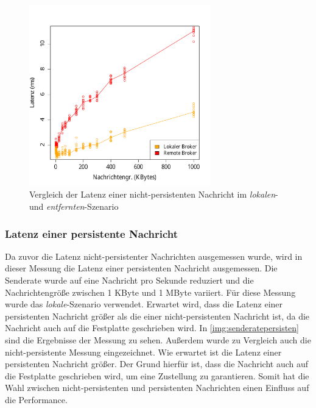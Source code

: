 \begin{figure}
\center
  \includegraphics[width=0.7\textwidth]{images/measurement/rate-limit-1-AvsB.pdf}
  \caption{Vergleich der Latenz einer nicht-persistenten Nachricht im \textit{lokalen}- und \textit{entfernten}-Szenario}
  \label{img:senderate1-B}
\end{figure}

\subsubsection{Latenz einer persistente Nachricht}
Da zuvor die Latenz nicht-persistenter Nachrichten ausgemessen wurde, wird in dieser Messung die Latenz einer persistenten Nachricht ausgemessen. Die Senderate wurde auf eine Nachricht pro Sekunde reduziert und die Nachrichtengröße zwischen 1 KByte und 1 MByte variiert. Für diese Messung wurde das \textit{lokale}-Szenario verwendet. Erwartet wird, dass die Latenz einer persistenten Nachricht größer als die einer nicht-persistenten Nachricht ist, da die Nachricht auch auf die Festplatte geschrieben wird.
In \autoref{img:senderatepersisten} sind die Ergebnisse der Messung zu sehen. Außerdem wurde zu Vergleich auch die nicht-persistente Messung eingezeichnet. Wie erwartet ist die Latenz einer persistenten Nachricht größer. Der Grund hierfür ist, dass die Nachricht auch auf die Festplatte geschrieben wird, um eine Zustellung zu garantieren. Somit hat die Wahl zwischen nicht-persistenten und persistenten Nachrichten einen Einfluss auf die Performance.

